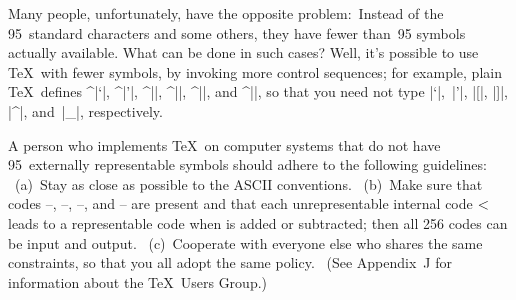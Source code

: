 Many people, unfortunately, have the opposite problem:\ Instead of the
95~standard characters and some others, they have fewer than~95 symbols
actually available. What can be done in such cases? Well, it's possible
to use \TeX\ with fewer symbols, by invoking more control
sequences; for example, plain \TeX\ defines ^|\lq|, ^|\rq|, ^|\lbrack|,
^|\rbrack|, ^|\sp|, and ^|\sb|, so that you need not type |`|,~|'|, |[|, |]|,
|^|, and~|_|, respectively.

A person who implements \TeX\ on computer systems that do not have
95~externally representable symbols should adhere to the following
guidelines: \ (a)~Stay as close as possible to the ASCII conventions.
\ (b)~Make sure that codes --, --,
--, and -- are present and that
each unrepresentable
internal code $<\hbox{}$ leads to a representable code when  is
added or subtracted; then all 256 codes can be input and output.
\ (c)~Cooperate with everyone else who shares
the same constraints, so that you all adopt the same policy.
\ (See Appendix~J for information about the \TeX\ Users Group.)

